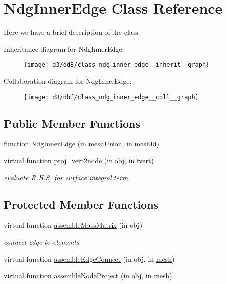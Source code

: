 \hypertarget{class_ndg_inner_edge}{}\section{Ndg\+Inner\+Edge Class Reference}
\label{class_ndg_inner_edge}


Here we have a brief description of the class.  




Inheritance diagram for Ndg\+Inner\+Edge\+:
\nopagebreak
\begin{figure}[H]
\begin{center}
\leavevmode
\texttt{[image: d3/dd8/class\_ndg\_inner\_edge\_\_inherit\_\_graph]}
\end{center}
\end{figure}


Collaboration diagram for Ndg\+Inner\+Edge\+:
\nopagebreak
\begin{figure}[H]
\begin{center}
\leavevmode
\texttt{[image: d8/dbf/class\_ndg\_inner\_edge\_\_coll\_\_graph]}
\end{center}
\end{figure}
\subsection*{Public Member Functions}
\begin{DoxyCompactItemize}
\item 
function \hyperlink{class_ndg_inner_edge_ae574506fcc14f7065d74e05a42c1ba17}{Ndg\+Inner\+Edge} (in mesh\+Union, in mesh\+Id)
\item 
virtual function \hyperlink{class_ndg_inner_edge_aa01bf86216785b63cb55f19e890eebd3}{proj\+\_\+vert2node} (in obj, in fvert)
\begin{DoxyCompactList}\small\item\em evaluate R.\+H.\+S. for surface integral term \end{DoxyCompactList}\end{DoxyCompactItemize}
\subsection*{Protected Member Functions}
\begin{DoxyCompactItemize}
\item 
virtual function \hyperlink{class_ndg_inner_edge_ac56cf77d4f3e169d24b784ee69791192}{assemble\+Mass\+Matrix} (in obj)
\begin{DoxyCompactList}\small\item\em connect edge to elements \end{DoxyCompactList}\item 
virtual function \hyperlink{class_ndg_inner_edge_a9e6246997f6d74a9116c430816ac7400}{assemble\+Edge\+Connect} (in obj, in \hyperlink{class_ndg_inner_edge_a703bdf93b4da38294056ccc9e4042491}{mesh})
\item 
virtual function \hyperlink{class_ndg_inner_edge_a48f6636e6e63a2f0020c890bc7f8af36}{assemble\+Node\+Project} (in obj, in \hyperlink{class_ndg_inner_edge_a703bdf93b4da38294056ccc9e4042491}{mesh})
\end{DoxyCompactItemize}
